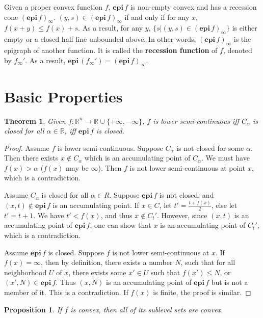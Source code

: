 \documentclass[openany]{book}
\newtheorem{proposition}{Proposition}[chapter]
\newtheorem{theorem}{Theorem}[chapter]
\theoremstyle{definition}
\theoremstyle{remark}
\begin{document}
Given a proper convex function $f$, $\mathbf{epi}\,f$ is non-empty convex and has a recession cone $(\mathbf{epi}\,f)_{\infty}$. $(y,s)\in(\mathbf{epi}\,f)_{\infty}$ if and only if for any $x$, $f(x+y)\le f(x)+s$. As a result, for any $y$, $\{s|(y,s)\in(\mathbf{epi}\,f)_{\infty}\}$ is either empty or a closed half line unbounded above. In other words, $(\mathbf{epi}\,f)_{\infty}$ is the epigraph of another function. It is called the \textbf{recession function} of $f$, denoted by $f_{\infty}'$. As a result, $\mathbf{epi}\,(f_{\infty}')=(\mathbf{epi}\,f)_{\infty}$.

\section{Basic Properties}
\begin{theorem}\label{subEpiLowcontEquiv}
    Given $f:\mathbb{R}^n\rightarrow\mathbb{R}\cup\{+\infty,-\infty\}$, $f$ is lower semi-continuous iff $C_{\alpha}$ is closed for all $\alpha\in \mathbb{R}$, iff $\mathbf{epi}\,f$ is closed.
\end{theorem}
\begin{proof}
    Assume $f$ is lower semi-continuous. Suppose $C_{\alpha}$ is not closed for some $\alpha$. Then there exists $x\not\in C_{\alpha}$ which is an accumulating point of $C_{\alpha}$. We must have $f(x)>\alpha$ ($f(x)$ may be $\infty$). Then $f$ is not lower semi-continuous at point $x$, which is a contradiction.

    Assume $C_{\alpha}$ is closed for all $\alpha\in R$. Suppose $\mathbf{epi}\,f$ is not closed, and $(x,t)\not\in \mathbf{epi}\,f$ is an accumulating point. If $x\in C$, let $t'=\frac{t+f(x)}{2}$, else let $t'=t+1$. We have $t'<f(x)$, and thus $x\not\in C_t'$. However, since $(x,t)$ is an accumulating point of $\mathbf{epi}\,f$, one can show that $x$ is an accumulating point of $C_t'$, which is a contradiction.

    Assume $\mathbf{epi}\,f$ is closed. Suppose $f$ is not lower semi-continuous at $x$. If $f(x)=\infty$, then by definition, there exists a number $N$, such that for all neighborhood $U$ of $x$, there exists some $x'\in U$ such that $f(x')\le N$, or $(x',N)\in \mathbf{epi}\,f$. Thus $(x,N)$ is an accumulating point of $\mathbf{epi}\,f$ but is not a member of it. This is a contradiction. If $f(x)$ is finite, the proof is similar.
\end{proof}
\begin{proposition}
    If $f$ is convex, then all of its sublevel sets are convex.
\end{proposition}
\end{document}

